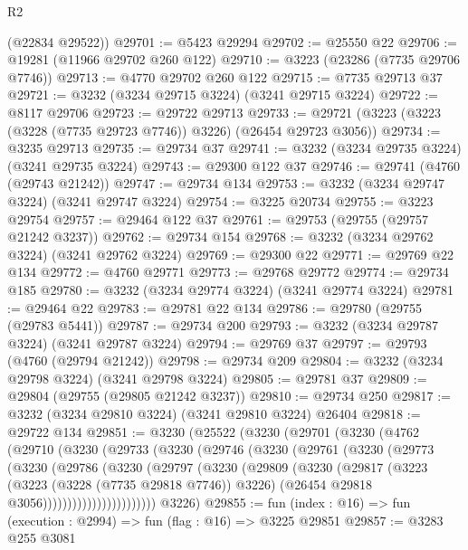 \begin{lexlean}{R2}
\begin{coremodule}
      (@22834 @29522))
@29701 := @5423 @29294
@29702 := @25550 @22
@29706 := @19281 (@11966 @29702 @260 @122)
@29710 := @3223 (@23286 (@7735 @29706 @7746))
@29713 := @4770 @29702 @260 @122
@29715 := @7735 @29713 @37
@29721 := @3232 (@3234 @29715 @3224) (@3241 @29715 @3224)
@29722 := @8117 @29706
@29723 := @29722 @29713
@29733 := @29721 (@3223 (@3223 (@3228 (@7735 @29723 @7746)) @3226) (@26454 @29723 @3056))
@29734 := @3235 @29713
@29735 := @29734 @37
@29741 := @3232 (@3234 @29735 @3224) (@3241 @29735 @3224)
@29743 := @29300 @122 @37
@29746 := @29741 (@4760 (@29743 @21242))
@29747 := @29734 @134
@29753 := @3232 (@3234 @29747 @3224) (@3241 @29747 @3224)
@29754 := @3225 @20734
@29755 := @3223 @29754
@29757 := @29464 @122 @37
@29761 := @29753 (@29755 (@29757 @21242 @3237))
@29762 := @29734 @154
@29768 := @3232 (@3234 @29762 @3224) (@3241 @29762 @3224)
@29769 := @29300 @22
@29771 := @29769 @22 @134
@29772 := @4760 @29771
@29773 := @29768 @29772
@29774 := @29734 @185
@29780 := @3232 (@3234 @29774 @3224) (@3241 @29774 @3224)
@29781 := @29464 @22
@29783 := @29781 @22 @134
@29786 := @29780 (@29755 (@29783 @5441))
@29787 := @29734 @200
@29793 := @3232 (@3234 @29787 @3224) (@3241 @29787 @3224)
@29794 := @29769 @37
@29797 := @29793 (@4760 (@29794 @21242))
@29798 := @29734 @209
@29804 := @3232 (@3234 @29798 @3224) (@3241 @29798 @3224)
@29805 := @29781 @37
@29809 := @29804 (@29755 (@29805 @21242 @3237))
@29810 := @29734 @250
@29817 := @3232 (@3234 @29810 @3224) (@3241 @29810 @3224) @26404
@29818 := @29722 @134
@29851 := @3230
    (@25522
      (@3230
        (@29701
          (@3230
            (@4762
              (@29710
                (@3230
                  (@29733
                    (@3230
                      (@29746
                        (@3230
                          (@29761
                            (@3230
                              (@29773
                                (@3230
                                  (@29786
                                    (@3230
                                      (@29797
                                        (@3230
                                          (@29809
                                            (@3230
                                              (@29817
                                                (@3223
                                                  (@3223 (@3228 (@7735 @29818 @7746)) @3226)
                                                  (@26454 @29818 @3056)))))))))))))))))))))))
      @3226)
@29855 := fun (index : @16) => fun (execution : @2994) => fun (flag : @16) => @3225 @29851
@29857 := @3283 @255 @3081

\end{coremodule}
\end{lexlean}
